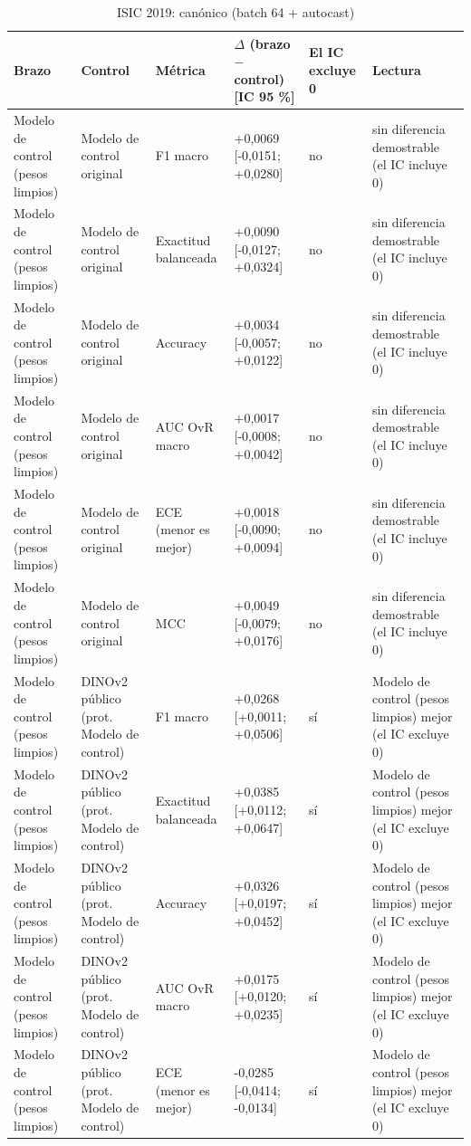 \begingroup\scriptsize
\begin{longtable}{@{}llllll@{}}
\caption{ISIC 2019: canónico (batch 64 + autocast)}\label{tab:contrast-isic2019-canon} \\
\toprule
Brazo & Control & Métrica & $\Delta$ (brazo $-$ control) [IC 95 \%] & El IC excluye 0 & Lectura \\
\midrule
Modelo de control (pesos limpios) & Modelo de control original & F1 macro & +0,0069 [-0,0151; +0,0280] & no & sin diferencia demostrable (el IC incluye 0) \\
Modelo de control (pesos limpios) & Modelo de control original & Exactitud balanceada & +0,0090 [-0,0127; +0,0324] & no & sin diferencia demostrable (el IC incluye 0) \\
Modelo de control (pesos limpios) & Modelo de control original & Accuracy & +0,0034 [-0,0057; +0,0122] & no & sin diferencia demostrable (el IC incluye 0) \\
Modelo de control (pesos limpios) & Modelo de control original & AUC OvR macro & +0,0017 [-0,0008; +0,0042] & no & sin diferencia demostrable (el IC incluye 0) \\
Modelo de control (pesos limpios) & Modelo de control original & ECE (menor es mejor) & +0,0018 [-0,0090; +0,0094] & no & sin diferencia demostrable (el IC incluye 0) \\
Modelo de control (pesos limpios) & Modelo de control original & MCC & +0,0049 [-0,0079; +0,0176] & no & sin diferencia demostrable (el IC incluye 0) \\
Modelo de control (pesos limpios) & DINOv2 público (prot. Modelo de control) & F1 macro & +0,0268 [+0,0011; +0,0506] & sí & Modelo de control (pesos limpios) mejor (el IC excluye 0) \\
Modelo de control (pesos limpios) & DINOv2 público (prot. Modelo de control) & Exactitud balanceada & +0,0385 [+0,0112; +0,0647] & sí & Modelo de control (pesos limpios) mejor (el IC excluye 0) \\
Modelo de control (pesos limpios) & DINOv2 público (prot. Modelo de control) & Accuracy & +0,0326 [+0,0197; +0,0452] & sí & Modelo de control (pesos limpios) mejor (el IC excluye 0) \\
Modelo de control (pesos limpios) & DINOv2 público (prot. Modelo de control) & AUC OvR macro & +0,0175 [+0,0120; +0,0235] & sí & Modelo de control (pesos limpios) mejor (el IC excluye 0) \\
Modelo de control (pesos limpios) & DINOv2 público (prot. Modelo de control) & ECE (menor es mejor) & -0,0285 [-0,0414; -0,0134] & sí & Modelo de control (pesos limpios) mejor (el IC excluye 0) \\

\end{longtable}
